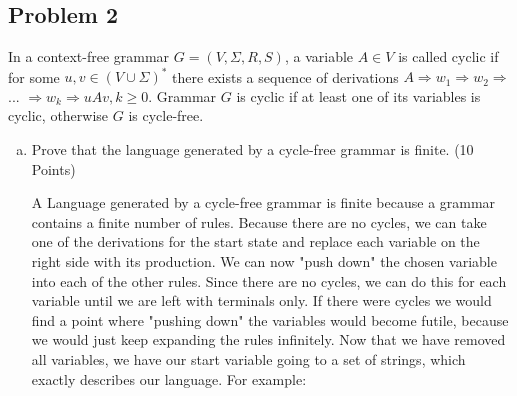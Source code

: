 \documentclass{article}
\begin{document}
\subsection*{Problem 2}
In a context-free grammar $G = (V, \Sigma, R, S)$, a variable $A \in V$ is called cyclic if for some $u,v \in
(V \cup \Sigma)^*$ there exists a sequence of derivations $A \Rightarrow w_1 \Rightarrow w_2 \Rightarrow$ ... 
$ \Rightarrow w_k \Rightarrow uAv,k \geq 0$. Grammar $G$ is cyclic if at least one of its variables is cyclic,
otherwise $G$ is cycle-free.
\begin{enumerate}[(a)]
\item Prove that the language generated by a cycle-free grammar is finite. (10 Points)

A Language generated by a cycle-free grammar is finite because a grammar contains a finite
number of rules. Because there are no cycles, we can take one of the derivations for the start state
and replace each variable on the right side with its production. We can now "push down" the chosen
variable into each of the other rules. Since there are no cycles, we can do this for each variable
until we are left with terminals only. If there were cycles we would find a point where "pushing
down" the variables would become futile, because we would just keep expanding the rules
infinitely. Now that we have removed all variables, we have our start variable going to a set of
strings, which exactly describes our language. For example: \\


\end{enumerate}
\end{document}
